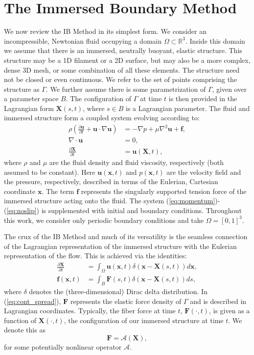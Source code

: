 \documentclass[preprint,12pt]{elsarticle}
\newcommand{\B}[1]{\mathbf{#1}}
\newcommand{\C}[1]{\mathcal{#1}}
\begin{document}
\section{The Immersed Boundary Method}
\label{Sec:IB}
We now review the IB Method in its simplest form. We consider an incompressible, Newtonian fluid occupying a domain $\Omega \subset \mathbb{R}^3$. Inside this domain
we assume that there is an immersed, neutrally buoyant, elastic structure. This structure may be a 1D filament or a 2D surface, but may also be a more complex,  dense 3D mesh, or some combination of all these elements. The structure need not be closed or even continuous. We refer to the set of points comprising the structure as $\Gamma$. We further assume there is some parametrization of $\Gamma$, given over a parameter space $B$. The configuration of $\Gamma$ at time $t$ is then provided in the Lagrangian form $\B{X}(s,t)$, where $s \in B$ is a Lagrangian parameter. The fluid and immersed structure form a coupled system evolving according to:
\begin{align}
\rho \left(\frac{\partial \B{u}}{\partial t} + \B{u}\cdot\nabla\B{u} \right) &= -\nabla p + \mu\nabla^2 \B{u} + \B{f}, \label{eq:momentum}\\ 
\nabla \cdot \B{u} &= 0, \label{eq:incompressibility}\\
\frac{\partial \B{X}}{\partial t}  &= \B{u}(\B{X},t), \label{eq:noslip}
\end{align}
where $\rho$ and $\mu$ are the fluid density and fluid viscosity, respectively (both assumed to be constant). Here $\B{u}(\B{x},t)$ and $p(\B{x},t)$ are the velocity field and the pressure, respectively, described in terms of the Eulerian, Cartesian coordinate $\B{x}$. The term $\B{f}$ represents the singularly supported tension force of the immersed structure acting onto the fluid. The system (\ref{eq:momentum})-(\ref{eq:noslip}) is supplemented with initial and boundary conditions. Throughout this work, we consider only periodic boundary conditions and take $\Omega = [0,1]^3$.

The crux of the IB Method and much of its versatility is the seamless connection of the Lagrangian representation of the immersed structure with the Eulerian representation of the flow. This is achieved via the identities:
\begin{align}
\frac{\partial \B{X}}{\partial t}  &= \int_{\Omega} \B{u}(\B{x},t)\delta(\B{x}-\B{X}(s,t)) d \B{x}, \label{eq:cont_interp} \\
\B{f}(\B{x},t) &= \int_{B} \B{F}(s,t)\delta(\B{x}-\B{X}(s,t)) ds
\label{eq:cont_spread},
\end{align}
where $\delta$ denotes the (three-dimensional) Dirac delta distribution. In (\ref{eq:cont_spread}), $\B{F}$
represents the elastic force density of $\Gamma$ and is described in Lagrangian coordinates. Typically,   the fiber force at time $t$, $\B{F}(\cdot,t)$, is given as a function of $\B{X}(\cdot,t)$, the configuration of our immersed structure at time $t$. We denote this as
\begin{equation}
\B{F} = \C{A}(\B{X}),
\end{equation}
for some potentially nonlinear operator $\C{A}$.
\end{document}
